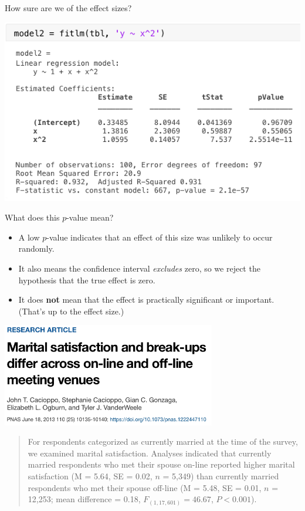 \documentclass{beamer}
\begin{document}
\begin{frame}{How sure are we of the effect sizes?}

\includegraphics{fitlm}

\end{frame}

\begin{frame}{What does this $p$-value mean?}

\begin{itemize}
	\item A low $p$-value indicates that an effect of this size was unlikely to occur randomly.
	\item It also means the confidence interval \emph{excludes} zero, so we reject the hypothesis that the true effect is zero.
	\pause
	\item It does \textbf{not} mean that the effect is practically significant or important. (That's up to the effect size.)
\end{itemize}
	
\end{frame}

\begin{frame}

\begin{center}
\includegraphics[width=0.7\textwidth]{online-meet}
\end{center}

\begin{quotation}\small
	For respondents categorized as currently married at the time of the survey, we examined marital satisfaction. Analyses indicated that currently married respondents who met their spouse on-line reported higher marital satisfaction (M = 5.64, SE = 0.02, $n$ = 5,349) than currently married respondents who met their spouse off-line (M = 5.48, SE = 0.01, $n$ = 12,253; mean difference = 0.18, $F_{(1, 17,601)} = 46.67$, $P < 0.001$).
\end{quotation}
	
\end{frame}
\end{document}
